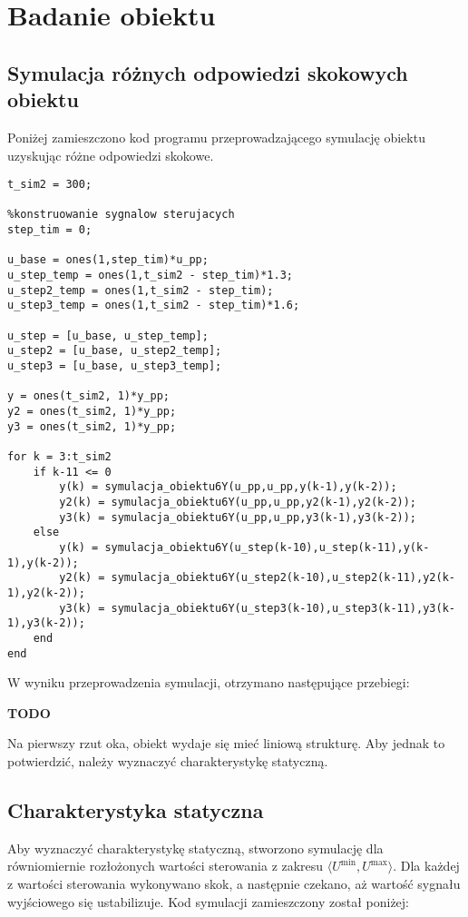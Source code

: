 \chapter{Badanie obiektu}
\section{Symulacja różnych odpowiedzi skokowych obiektu}

Poniżej zamieszczono kod programu przeprowadzającego symulację obiektu uzyskując różne odpowiedzi skokowe. 

\begin{lstlisting}[style=Matlab-editor, basicstyle=\tiny]
t_sim2 = 300;

%konstruowanie sygnalow sterujacych
step_tim = 0;

u_base = ones(1,step_tim)*u_pp;
u_step_temp = ones(1,t_sim2 - step_tim)*1.3;
u_step2_temp = ones(1,t_sim2 - step_tim);
u_step3_temp = ones(1,t_sim2 - step_tim)*1.6;

u_step = [u_base, u_step_temp];
u_step2 = [u_base, u_step2_temp];
u_step3 = [u_base, u_step3_temp];

y = ones(t_sim2, 1)*y_pp;
y2 = ones(t_sim2, 1)*y_pp;
y3 = ones(t_sim2, 1)*y_pp;

for k = 3:t_sim2
    if k-11 <= 0
        y(k) = symulacja_obiektu6Y(u_pp,u_pp,y(k-1),y(k-2));
        y2(k) = symulacja_obiektu6Y(u_pp,u_pp,y2(k-1),y2(k-2));
        y3(k) = symulacja_obiektu6Y(u_pp,u_pp,y3(k-1),y3(k-2));
    else
        y(k) = symulacja_obiektu6Y(u_step(k-10),u_step(k-11),y(k-1),y(k-2));
        y2(k) = symulacja_obiektu6Y(u_step2(k-10),u_step2(k-11),y2(k-1),y2(k-2));
        y3(k) = symulacja_obiektu6Y(u_step3(k-10),u_step3(k-11),y3(k-1),y3(k-2));      
    end
end
\end{lstlisting}

W wyniku przeprowadzenia symulacji, otrzymano następujące przebiegi:
\par \textbf{TODO}

\par Na pierwszy rzut oka, obiekt wydaje się mieć liniową strukturę. Aby jednak to potwierdzić, należy wyznaczyć charakterystykę statyczną.


\section{Charakterystyka statyczna}
Aby wyznaczyć charakterystykę statyczną, stworzono symulację dla równiomiernie rozłożonych wartości sterowania z zakresu $ \langle  U^{\textrm{min}}, U^{\textrm{max}}\rangle $. Dla każdej z wartości sterowania wykonywano skok, a następnie czekano, aż wartość sygnału wyjściowego się ustabilizuje. Kod symulacji zamieszczony został poniżej:

